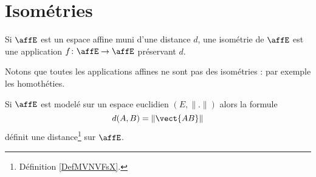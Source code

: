 \section{Isométries}

\begin{definition}       \label{DEFooZGKBooGgjkgs}
	Si \( \affE\) est un espace affine muni d'une distance \( d\), une isométrie de \( \affE\) est une application \( f\colon \affE\to \affE\) préservant \( d\).
\end{definition}
Notons que toutes les applications affines ne sont pas des isométries : par exemple les homothéties.

\begin{proposition}     \label{PROPooHSOGooBbFTYt}
	Si \( \affE\) est modelé sur un espace euclidien \( (E,\| . \|)\) alors la formule
	\begin{equation}
		d(A,B)=\| \vect{ AB } \|
	\end{equation}
	définit une distance\footnote{Définition \ref{DefMVNVFsX}.} sur \( \affE\).
\end{proposition}

